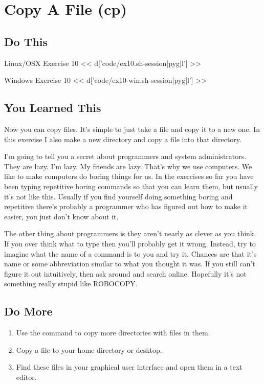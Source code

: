 \chapter{Copy A File (cp)}

\section{Do This}

\begin{code}{Linux/OSX Exercise 10}
<< d['code/ex10.sh-session|pyg|l'] >>
\end{code}

\begin{code}{Windows Exercise 10}
<< d['code/ex10-win.sh-session|pyg|l'] >>
\end{code}

\section{You Learned This}

Now you can copy files.  It's simple to just take a file and copy it to a new
one.  In this exercise I also make a new directory and copy a file into that
directory.

I'm going to tell you a secret about programmers and system administrators.
They are lazy.  I'm lazy.  My friends are lazy.  That's why we use computers.
We like to make computers do boring things for us.  In the exercises so far
you have been typing repetitive boring commands so that you can learn them,
but usually it's not like this.  Usually if you find yourself doing something
boring and repetitive there's probably a programmer who has figured out
how to make it easier, you just don't know about it.

The other thing about programmers is they aren't nearly as clever as you think.
If you over think what to type then you'll probably get it wrong.  Instead, try
to imagine what the name of a command is to you and try it.  Chances are that
it's name or some abbreviation similar to what you thought it was.  If you still can't figure it out intuitively,
then ask around and search online. Hopefully it's not something really stupid like ROBOCOPY.


\section{Do More}

\begin{enumerate}
\item Use the  command to copy more directories with files in them.
\item Copy a file to your home directory or desktop.
\item Find these files in your graphical user interface and open them
    in a text editor.
\end{enumerate}


